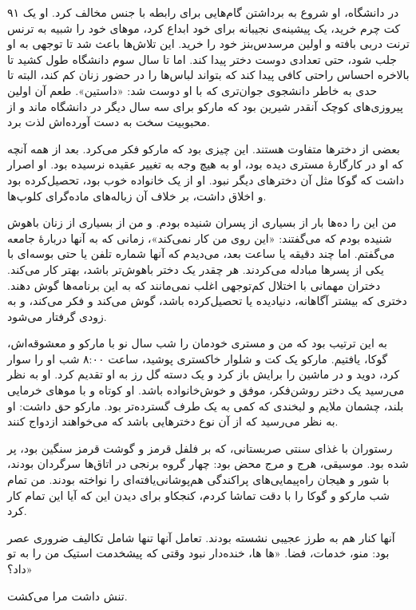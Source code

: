 ۹۱  
در دانشگاه، او شروع به برداشتن گام‌هایی برای رابطه با جنس مخالف کرد. او یک کت چرم خرید، یک پیشینه‌ی نجیبانه برای خود ابداع کرد، موهای خود را شبیه به ترنس ترنت دربی بافته و اولین مرسدس‌بنز خود را خرید. این تلاش‌ها باعث شد تا توجهی به او جلب شود، حتی تعدادی دوست دختر پیدا کند. اما تا سال سوم دانشگاه طول کشید تا بالاخره احساس راحتی کافی پیدا کند که بتواند لباس‌ها را در حضور زنان کم کند، البته تا حدی به خاطر دانشجوی جوان‌تری که با او دوست شد: «داستین». طعم آن اولین پیروزی‌های کوچک آنقدر شیرین بود که مارکو برای سه سال دیگر در دانشگاه ماند و از محبوبیت سخت به دست آورده‌اش لذت برد.

بعضی از دخترها متفاوت هستند. این چیزی بود که مارکو فکر می‌کرد. بعد از همه آنچه که او در کارگارهٔ مستری دیده بود، او به هیچ وجه به تغییر عقیده نرسیده بود. او اصرار داشت که گوکا مثل آن دخترهای دیگر نبود. او از یک خانواده خوب بود، تحصیل‌کرده بود و اخلاق داشت، بر خلاف آن زباله‌های ماده‌گرای کلوپ‌ها.

من این را ده‌ها بار از بسیاری از پسران شنیده بودم. و من از بسیاری از زنان باهوش شنیده بودم که می‌گفتند: «این روی من کار نمی‌کند»، زمانی که به آنها دربارهٔ جامعه می‌گفتم. اما چند دقیقه یا ساعت بعد، می‌دیدم که آنها شماره تلفن یا حتی بوسه‌ای با یکی از پسرها مبادله می‌کردند. هر چقدر یک دختر باهوش‌تر باشد، بهتر کار می‌کند. دختران مهمانی با اختلال کم‌توجهی اغلب نمی‌مانند که به این برنامه‌ها گوش دهند. دختری که بیشتر آگاهانه، دنیادیده یا تحصیل‌کرده باشد، گوش می‌کند و فکر می‌کند، و به زودی گرفتار می‌شود.

به این ترتیب بود که من و مستری خودمان را شب سال نو با مارکو و معشوقه‌اش، گوکا، یافتیم. مارکو یک کت و شلوار خاکستری پوشید، ساعت ۸:۰۰ شب او را سوار کرد، دوید و در ماشین را برایش باز کرد و یک دسته گل رز به او تقدیم کرد. او به نظر می‌رسید یک دختر روشن‌فکر، موفق و خوش‌خانواده باشد. او کوتاه و با موهای خرمایی بلند، چشمان ملایم و لبخندی که کمی به یک طرف گسترده‌تر بود. مارکو حق داشت: او به نظر می‌رسید که از آن نوع دخترهایی باشد که می‌خواهند ازدواج کنند.

رستوران با غذای سنتی صربستانی، که بر فلفل قرمز و گوشت قرمز سنگین بود، پر شده بود. موسیقی، هرج و مرج محض بود: چهار گروه برنجی در اتاق‌ها سرگردان بودند، با شور و هیجان راه‌پیمایی‌های پراکندگی هم‌پوشانی‌یافته‌ای را نواخته بودند. من تمام شب مارکو و گوکا را با دقت تماشا کردم، کنجکاو برای دیدن این که آیا این تمام کار کرد.

آنها کنار هم به طرز عجیبی نشسته بودند. تعامل آنها تنها شامل تکالیف ضروری عصر بود: منو، خدمات، فضا. «ها ها، خنده‌دار نبود وقتی که پیشخدمت استیک من را به تو داد؟»

تنش داشت مرا می‌کشت.

